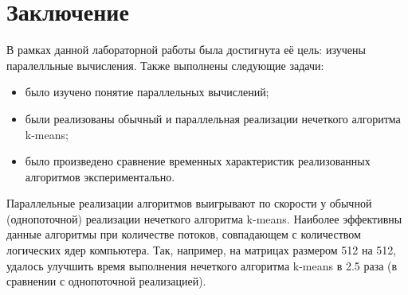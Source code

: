 \section*{\large Заключение}
    \par В рамках данной лабораторной работы была достигнута её цель: изучены паралелльные вычисления. Также выполнены следующие задачи:
    \begin{itemize}
    	\item было изучено понятие параллельных вычислений;
		\item были реализованы обычный и параллельная реализации нечеткого алгоритма k-means;
		\item было произведено сравнение временных характеристик реализованных алгоритмов экспериментально.
	\end{itemize}
	\par Параллельные реализации алгоритмов выигрывают по скорости у обычной (однопоточной) реализации нечеткого алгоритма k-means. Наиболее эффективны данные алгоритмы при количестве потоков, совпадающем с количеством логических ядер компьютера. Так, например, на матрицах размером 512 на 512, удалось улучшить время выполнения нечеткого алгоритма k-means в 2.5 раза (в сравнении с однопоточной реализацией).
\newpage
